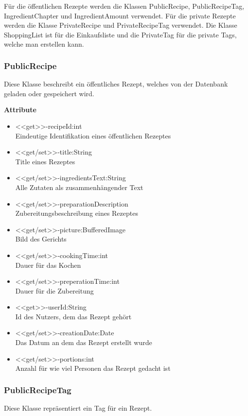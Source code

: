 Für die öffentlichen Rezepte werden die Klassen PublicRecipe, PublicRecipeTag, IngredientChapter und IngredientAmount verwendet.
Für die private Rezepte werden die Klasse PrivateRecipe und PrivateRecipeTag verwendet. Die Klasse ShoppingList ist für die Einkaufsliste und die PrivateTag für die private Tags, welche man erstellen kann.

\subsubsection{PublicRecipe}
Diese Klasse beschreibt ein öffentliches Rezept, welches von der Datenbank geladen oder gespeichert wird.

\textbf{Attribute}
\begin{itemize}
	\item <<get>>-recipeId:int\\Eindeutige Identifikation eines öffentlichen Rezeptes
	\item <<get/set>>-title:String\\Title eines Rezeptes
	\item <<get/set>>-ingredientsText:String\\Alle Zutaten als zusammenhängender Text
	\item <<get/set>>-preparationDescription\\Zubereitungsbeschreibung eines Rezeptes
	\item <<get/set>>-picture:BufferedImage\\Bild des Gerichts
	\item <<get/set>>-cookingTime:int\\Dauer für das Kochen
	\item <<get/set>>-preperationTime:int\\Dauer für die Zubereitung
	\item <<get>>-userId:String\\Id des Nutzers, dem das Rezept gehört
	\item <<get/set>>-creationDate:Date\\Das Datum an dem das Rezept erstellt wurde
	\item <<get/set>>-portions:int\\Anzahl für wie viel Personen das Rezept gedacht ist
\end{itemize}

\subsubsection{PublicRecipeTag}
Diese Klasse repräsentiert ein Tag für ein Rezept.

